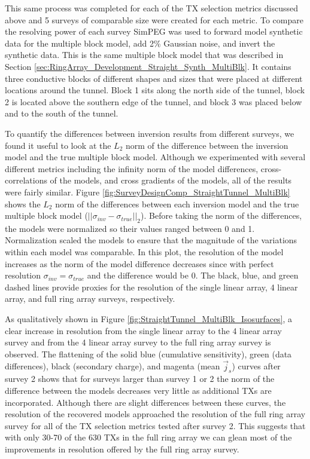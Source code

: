 \documentclass[preprint,authoryear,12pt]{elsarticle}
\begin{document}
This same process was completed for each of the TX selection metrics discussed above and 5 surveys of comparable size were created for each metric. To compare the resolving power of each survey SimPEG was used to forward model synthetic data for the multiple block model, add 2\% Gaussian noise, and invert the synthetic data. This is the same multiple block model that was described in Section \ref{sec:RingArray_Development_Straight_Synth_MultiBlk}. It contains three conductive blocks of different shapes and sizes that were placed at different locations around the tunnel. Block 1 sits along the north side of the tunnel, block 2 is located above the southern edge of the tunnel, and block 3 was placed below and to the south of the tunnel.

To quantify the differences between inversion results from different surveys, we found it useful to look at the $L_2$ norm of the difference between the inversion model and the true multiple block model. Although we experimented with several different metrics including the infinity norm of the model differences, cross-correlations of the models, and cross gradients of the models, all of the results were fairly similar. Figure \ref{fig:SurveyDesignComp_StraightTunnel_MultiBlk} shows the $L_2$ norm of the differences between each inversion model and the true multiple block model ($\left|| \sigma_{inv} - \sigma_{true} \right||_2$). Before taking the norm of the differences, the models were normalized so their values ranged between 0 and 1. Normalization scaled the models to ensure that the magnitude of the variations within each model was comparable. In this plot, the resolution of the model increases as the norm of the model difference decreases since with perfect resolution $\sigma_{inv} = \sigma_{true}$ and the difference would be 0. The black, blue, and green dashed lines provide proxies for the resolution of the single linear array, 4 linear array, and full ring array surveys, respectively.

As qualitatively shown in Figure \ref{fig:StraightTunnel_MultiBlk_Isosurfaces}, a clear increase in resolution from the single linear array to the 4 linear array survey and from the 4 linear array survey to the full ring array survey is observed. The flattening of the solid blue (cumulative sensitivity), green (data differences), black (secondary charge), and magenta (mean $\vec{j}_s$) curves after survey 2 shows that for surveys larger than survey 1 or 2 the norm of the difference between the models decreases very little as additional TXs are incorporated. Although there are slight differences between these curves, the resolution of the recovered models approached the resolution of the full ring array survey for all of the TX selection metrics tested after survey 2. This suggests that with only 30-70 of the 630 TXs in the full ring array we can glean most of the improvements in resolution offered by the full ring array survey.
\end{document}
